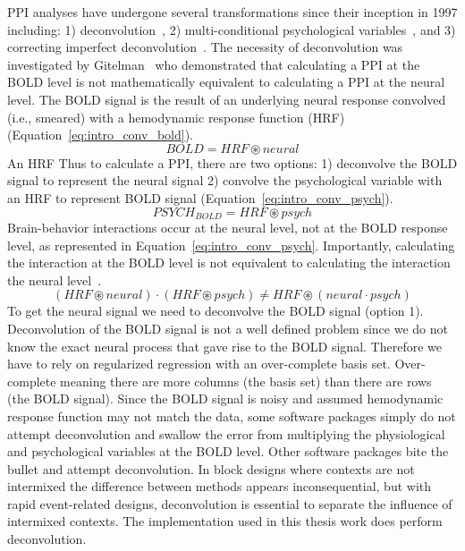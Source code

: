 \documentclass[phd,appendix,figures]{uithesis}
\begin{document}
PPI analyses have undergone several transformations since their inception in 1997 including:
1) deconvolution~\cite{Gitelman2003}, 2) multi-conditional psychological variables~\cite{McLaren2012},
and 3) correcting imperfect deconvolution~\cite{Di2017}.
The necessity of deconvolution was investigated by Gitelman~\cite{Gitelman2003} who demonstrated
that calculating a PPI at the BOLD level is not mathematically equivalent to calculating
a PPI at the neural level.
The BOLD signal is the result of an underlying neural response convolved (i.e., smeared)
with a hemodynamic response function (HRF)(Equation~\ref{eq:intro_conv_bold}).
\begin{equation}
  BOLD = HRF \circledast neural
  \label{eq:intro_conv_bold}
\end{equation}
An HRF 
Thus to calculate a PPI, there are two options:
1) deconvolve the BOLD signal to represent the neural signal
2) convolve the psychological variable with an HRF to represent BOLD signal (Equation~\ref{eq:intro_conv_psych}).
\begin{equation}
  PSYCH_{BOLD} = HRF \circledast psych
  \label{eq:intro_conv_psych}
\end{equation}
Brain-behavior interactions occur at the neural level, not at the
BOLD response level, as represented in Equation~\ref{eq:intro_conv_psych}.
Importantly, calculating the interaction at the BOLD level is not
equivalent to calculating the interaction the neural level~\cite{Gitelman2003}.
\begin{equation}
	(HRF \circledast neural) \cdot (HRF \circledast psych) \neq HRF \circledast (neural \cdot psych)
\end{equation}
To get the neural signal we need to deconvolve the BOLD signal (option 1).
Deconvolution of the BOLD signal is not a well defined problem since
we do not know the exact neural process that gave rise to the BOLD signal.
Therefore we have to rely on regularized regression with an over-complete
basis set.
Over-complete meaning there are more columns (the basis set) than there
are rows (the BOLD signal).
Since the BOLD signal is noisy and assumed hemodynamic response function
may not match the data, some software packages simply do not attempt
deconvolution and swallow the error from multiplying the physiological and psychological
variables at the BOLD level.
Other software packages bite the bullet and attempt deconvolution.
In block designs where contexts are not intermixed the difference between
methods appears inconsequential, but with rapid event-related designs,
deconvolution is essential to separate the influence of intermixed contexts.
The implementation used in this thesis work does perform deconvolution.
\end{document}
